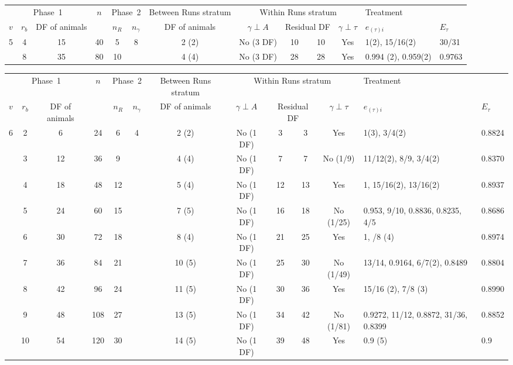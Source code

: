 \documentclass[a4paper,11pt]{article}
\begin{document}
\begin{landscape}
\begin{tabular}[t]{|c|c|c|c|c|c|c|c|c|c|c|p{1in}|p{0.4in}|} \hline
\multicolumn{3}{|c|}{Phase~1}  & $n$  & \multicolumn{2}{c|}{Phase~2} & Between Runs stratum  & \multicolumn{4}{c|}{Within Runs stratum} & \multicolumn{2}{p{1.4in}|}{Treatment} \\ \cline{1-3} \cline{5-6}\cline{7-13}
$v$ & $r_b$ & DF of animals &  & $n_R$ & $n_\gamma$ & DF of animals &  $\gamma \perp A$ & \multicolumn{2}{c|}{Residual DF} & $\gamma \perp \tau$ & $e_{(\tau)i}$ &$E_\tau$\\ \hline
5 & 4 & 15 & 40 & 5 & 8 & 2 (2) & No (3 DF) & 10 & 10 & Yes & 1(2), 15/16(2) & 30/31 \\ \hline 
 & 8 & 35 & 80 & 10 &  & 4 (4) & No (3 DF) & 28 & 28 & Yes & 0.994 (2), 0.959(2) & 0.9763 \\ \hline 
\end{tabular}

\begin{tabular}[t]{|c|c|c|c|c|c|c|c|c|c|c|p{1in}|p{0.4in}|} \hline
\multicolumn{3}{|c|}{Phase~1}  & $n$  & \multicolumn{2}{c|}{Phase~2} & Between Runs stratum  & \multicolumn{4}{c|}{Within Runs stratum} & \multicolumn{2}{p{1.4in}|}{Treatment} \\ \cline{1-3} \cline{5-6}\cline{7-13}
$v$ & $r_b$ & DF of animals &  & $n_R$ & $n_\gamma$ & DF of animals &  $\gamma \perp A$ & \multicolumn{2}{c|}{Residual DF} & $\gamma \perp \tau$ & $e_{(\tau)i}$ &$E_\tau$\\ \hline
6 & 2 & 6 & 24 & 6 & 4 & 2 (2) & No (1 DF) & 3 & 3 & Yes & 1(3), 3/4(2) & 0.8824 \\ \hline 
 & 3 & 12 & 36 & 9 &  & 4 (4) & No (1 DF) & 7 & 7 & No (1/9) & 11/12(2), 8/9, 3/4(2)  & 0.8370 \\ \hline 
 & 4 & 18 & 48 & 12 &  & 5 (4) & No (1 DF) & 12 & 13 & Yes & 1, 15/16(2), 13/16(2) & 0.8937 \\ \hline 
 & 5 & 24 & 60 & 15 &  & 7 (5) & No (1 DF) & 16 & 18 & No (1/25) & 0.953, 9/10, 0.8836, 0.8235, 4/5 & 0.8686 \\ \hline 
 & 6 & 30 & 72 & 18 &  & 8 (4) & No (1 DF) & 21 & 25 & Yes & 1,  \newline 7/8 (4)  & 0.8974 \\ \hline 
 & 7 & 36 & 84 & 21 &  & 10 (5) & No (1 DF) & 25 & 30 & No (1/49) & 13/14, 0.9164, 6/7(2),  0.8489 & 0.8804 \\ \hline 
 & 8 & 42 & 96 & 24 &  & 11 (5) & No (1 DF) & 30 & 36 & Yes & 15/16 (2),  7/8 (3)  & 0.8990 \\ \hline 
 & 9 & 48 & 108 & 27 &  & 13 (5) & No (1 DF) & 34 & 42 & No (1/81) & 0.9272, 11/12, 0.8872, 31/36, 0.8399 & 0.8852 \\ \hline 
 & 10 & 54 & 120 & 30 &  & 14 (5) & No (1 DF) & 39 & 48 & Yes & 0.9 (5) & 0.9 \\ \hline 
\end{tabular}




\end{landscape}
\end{document}
